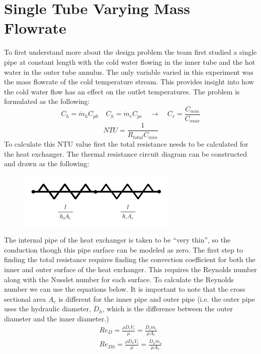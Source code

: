 \section{Single Tube Varying Mass Flowrate}
%
To first understand more about the design problem the team first studied a single pipe at constant length with the cold water flowing in the inner tube and the hot water in the outer tube annulus. The only variable varied in this experiment was the mass flowrate of the cold temperature stream. This provides insight into how the cold water flow has an effect on the outlet temperatures. The problem is formulated as the following:
%
\begin{equation} \label{eq_1}
    { C }_{ h }={ \dot { m }  }_{ h }{ C }_{ ph }\quad { C }_{ h }={ \dot { m }  }_{ c }{ C }_{ pc }\quad \rightarrow\quad { C }_{ r }=\frac { { C }_{ min } }{ { C }_{ max } } 
\end{equation}
%
\begin{equation} \label{eq_2}
    NTU=\frac { 1 }{ { R }_{ total }{ C }_{ min } } 
\end{equation}
%
To calculate this NTU value first the total resistance needs to be calculated for the heat exchanger. The thermal resistance circuit diagram can be constructed and drawn as the following:
%
\begin{figure}[H]
    \centering
    \includegraphics[width=3in]{pictures/part_1_total_resistance.png}
    \label{fig_part_1_1}
\end{figure}
%
\noindent
The internal pipe of the heat exchanger is taken to be ``very thin'', so the conduction though this pipe surface can be modeled as zero. The first step to finding the total resistance requires finding the convection coefficient for both the inner and outer surface of the heat exchanger. This requires the Reynolds number along with the Nusslet number for each surface. To calculate the Reynolds number we can use the equations below. It is important to note that the cross sectional area ${ A }_{ c }$ is different for the inner pipe and outer pipe (i.e. the outer pipe uses the hydraulic diameter, ${ D }_{ h }$, which is the difference between the outer diameter and the inner diameter.)
\begin{subequations}
\begin{eqnarray}
 { Re }_{ D } =\frac { \rho { D }_{ i }{ V }_{ i } }{ \mu  } =\frac { { D }_{ i }{ \dot { m }  }_{ i } }{ \mu { A }_{ c } } \\ 
 { Re }_{ Dh } =\frac { \rho { D }_{ h }{ V }_{ i } }{ \mu  } =\frac { { D }_{ h }{ \dot { m }  }_{ o } }{ \mu { A }_{ c } } 
\end{eqnarray}
\end{subequations}
